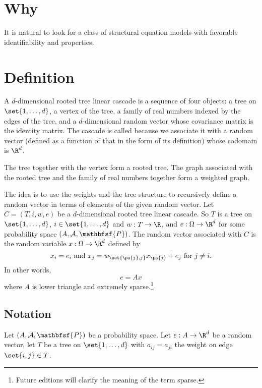 

\section*{Why}

It is natural to look for a class of structural equation models with favorable identifiability and properties.

\section*{Definition}

A \t{$d$-dimensional rooted tree linear cascade} is a sequence of four objects: a tree on $\set{1, \dots , d}$, a vertex of the tree, a family of real numbers indexed by the edges of the tree, and a $d$-dimensional random vector whose covariance matrix is the identity matrix.
The cascade is called  because we associate it with a random vector (defined as a function of that in the form of its definition) whose codomain is $\R ^d$.

The tree together with the vertex form a rooted tree.
The graph associated with the rooted tree and the family of real numbers together form a weighted graph.

The idea is to use the weights and the tree structure to recursively define a random vector in terms of elements of the given random vector.
Let $C = (T, i, w, e)$ be a $d$-dimensional rooted tree linear cascade.
So $T$ is a tree on $\set{1, \dots , d}$, $i \in \set{1, \dots , d}$ and $w: T \to \R $, and $e: \Omega  \to \R ^d$ for some probability space $(A, \mathcal{A} , \mathbfsf{P} )$.
The random vector associated with $C$ is the random variable $x: \Omega  \to \R ^d$ defined by
    \[
x_i = e_i \text{ and } x_j = w_{\set{\pa{j}, j}}x_{\pa{j}} + e_{j} \text{ for } j \neq i.
    \]
In other words,
    \[
e = Ax
    \]
where $A$ is lower triangle and extremely sparse.\footnote{Future editions will clarify the meaning of the term sparse.}

\subsection*{Notation}

Let $(A, \mathcal{A} , \mathbfsf{P} )$ be a probability space.
Let $e: A \to \R ^d$ be a random vector, let $T$ be a tree on $\set{1, \dots , d}$ with $a_{ij} = a_{ji}$ the weight on edge $\set{i, j} \in T$.
